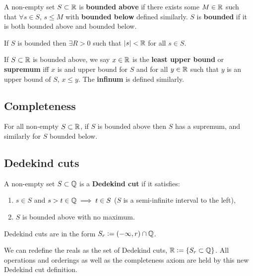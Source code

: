 \begin{definition}[Bounded]
    A non-empty set $S\subset\mathbb{R}$ is \textbf{bounded above} if there exists some $M\in\mathbb{R}$ such that $\forall s\in S$, $s\leq M$ with \textbf{bounded below} defined similarly. $S$ is \textbf{bounded} if it is both bounded above and bounded below.
\end{definition}

\begin{theorem}
    If $S$ is bounded then $\exists R>0$ such that $|s|<\mathbb{R}$ for all $s\in S$.
\end{theorem}

\begin{definition}
    If $S\subset\mathbb{R}$ is bounded above, we say $x\in\mathbb{R}$ is the \textbf{least upper bound} or \textbf{supremum} iff $x$ is and upper bound for $S$ and for all $y\in\mathbb{R}$ such that $y$ is an upper bound of $S$, $x\leq y$. The \textbf{infinum} is defined similarly.
\end{definition}

\subsection{Completeness}

\begin{theorem}
    For all non-empty $S\subset\mathbb{R}$, if $S$ is bounded above then $S$ has a supremum, and similarly for $S$ bounded below.
\end{theorem}

\subsection{Dedekind cuts}

\begin{definition}
    A non-empty set $S\subset\mathbb{Q}$ is a \textbf{Dedekind cut} if it satisfies: \begin{enumerate}
        \item $s\in S$ and $s>t\in\mathbb{Q} \implies t\in S$ ($S$ is a semi-infinite interval to the left),
        \item $S$ is bounded above with no maximum.
    \end{enumerate} Dedekind cuts are in the form $S_r:=(-\infty,r)\cap\mathbb{Q}$.
\end{definition}

\begin{theorem}
    We can redefine the reals as the set of Dedekind cuts, $\mathbb{R}:= \{S_r\subset\mathbb{Q}\}$. All operations and orderings as well as the completeness axiom are held by this new Dedekind cut definition.
\end{theorem}

